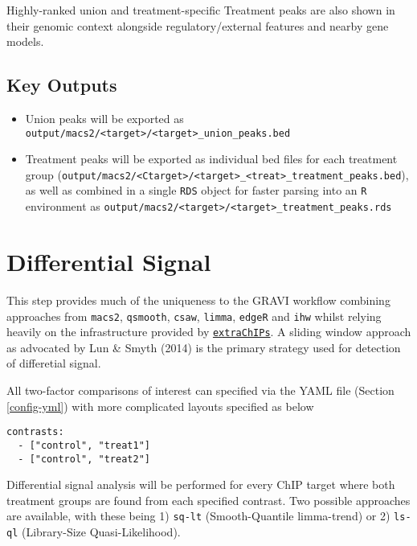 \documentclass[
]{book}
\providecommand{\tightlist}{%
  \setlength{\itemsep}{0pt}\setlength{\parskip}{0pt}}
\begin{document}
Highly-ranked union and treatment-specific Treatment peaks are also shown in their genomic context alongside regulatory/external features and nearby gene models.

\hypertarget{key-outputs}{%
\subsection*{Key Outputs}\label{key-outputs}}

\begin{itemize}
\tightlist
\item
  Union peaks will be exported as \texttt{output/macs2/\textless{}target\textgreater{}/\textless{}target\textgreater{}\_union\_peaks.bed}
\item
  Treatment peaks will be exported as individual bed files for each treatment group (\texttt{output/macs2/\textless{}Ctarget\textgreater{}/\textless{}target\textgreater{}\_\textless{}treat\textgreater{}\_treatment\_peaks.bed}), as well as combined in a single \texttt{RDS} object for faster parsing into an \texttt{R} environment as \texttt{output/macs2/\textless{}target\textgreater{}/\textless{}target\textgreater{}\_treatment\_peaks.rds}
\end{itemize}

\hypertarget{differential-signal}{%
\section{Differential Signal}\label{differential-signal}}

This step provides much of the uniqueness to the GRAVI workflow combining approaches from \texttt{macs2}\citep{macs2}, \texttt{qsmooth}\citep{qsmooth}, \texttt{csaw}\citep{csaw}, \texttt{limma}\citep{limma}, \texttt{edgeR}\citep{edger} and \texttt{ihw}\citep{ihw} whilst relying heavily on the infrastructure provided by \href{https://bioconductor.org/packages/release/bioc/html/extraChIPs.html}{\texttt{extraChIPs}}.
A sliding window approach as advocated by Lun \& Smyth (2014) is the primary strategy used for detection of differetial signal.

All two-factor comparisons of interest can specified via the YAML file (Section \ref{config-yml}) with more complicated layouts specified as below

\begin{verbatim}
contrasts:
  - ["control", "treat1"]
  - ["control", "treat2"]
\end{verbatim}

Differential signal analysis will be performed for every ChIP target where both treatment groups are found from each specified contrast.
Two possible approaches are available, with these being 1) \texttt{sq-lt} (Smooth-Quantile limma-trend) or 2) \texttt{ls-ql} (Library-Size Quasi-Likelihood).
\end{document}

